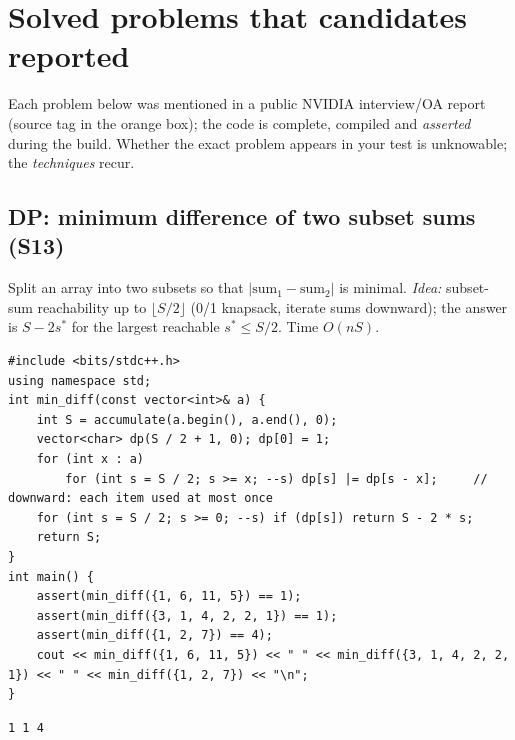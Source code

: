 \documentclass[10pt,a4paper,openany,oneside]{report}
\newcommand{\prio}[1]{\texorpdfstring{\ifcase#1\or{\color{gold}\ding{72}}\or{\color{gold}\ding{72}\ding{72}}\or{\color{gold}\ding{72}\ding{72}\ding{72}}\fi}{}}
\begin{document}
\section{Solved problems that candidates reported \prio{3}}
\label{sec:dsb}
Each problem below was mentioned in a public NVIDIA interview/OA report (source tag in the orange box); the code is complete, compiled and \emph{asserted} during the build. Whether the exact problem appears in your test is unknowable; the \emph{techniques} recur.

\subsection{DP: minimum difference of two subset sums (S13)}
\begin{srcbox}
Split an array into two subsets so that $|\text{sum}_1-\text{sum}_2|$ is minimal. \emph{Idea:} subset-sum reachability up to $\lfloor S/2\rfloor$ (0/1 knapsack, iterate sums downward); the answer is $S-2s^*$ for the largest reachable $s^*\le S/2$. Time $O(nS)$.
\end{srcbox}
\begin{lstlisting}[language={[11]C++}]
#include <bits/stdc++.h>
using namespace std;
int min_diff(const vector<int>& a) {
    int S = accumulate(a.begin(), a.end(), 0);
    vector<char> dp(S / 2 + 1, 0); dp[0] = 1;
    for (int x : a)
        for (int s = S / 2; s >= x; --s) dp[s] |= dp[s - x];     // downward: each item used at most once
    for (int s = S / 2; s >= 0; --s) if (dp[s]) return S - 2 * s;
    return S;
}
int main() {
    assert(min_diff({1, 6, 11, 5}) == 1);
    assert(min_diff({3, 1, 4, 2, 2, 1}) == 1);
    assert(min_diff({1, 2, 7}) == 4);
    cout << min_diff({1, 6, 11, 5}) << " " << min_diff({3, 1, 4, 2, 2, 1}) << " " << min_diff({1, 2, 7}) << "\n";
}
\end{lstlisting}
\begin{lstlisting}[style=out,title={Answer: captured output}]
1 1 4
\end{lstlisting}
\end{document}
